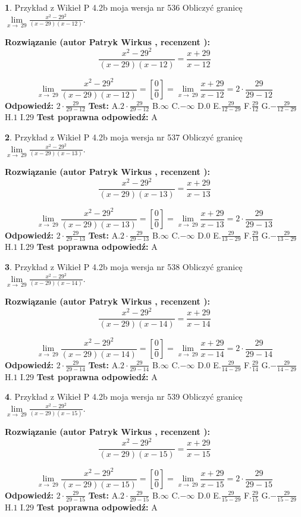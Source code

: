 \documentclass[12pt, a4paper]{article}
\theoremstyle{definition} %
\newtheorem{zad}{}
\newcommand{\zadStart}[1]{\begin{zad}#1\newline}
\newcommand{\zadStop}{\end{zad}}
\newcommand{\rozwStart}[2]{\noindent \textbf{Rozwiązanie (autor #1 , recenzent #2): }\newline}
\newcommand{\rozwStop}{\newline}
\newcommand{\odpStart}{\noindent \textbf{Odpowiedź:}\newline}
\newcommand{\odpStop}{\newline}
\newcommand{\testStart}{\noindent \textbf{Test:}\newline}
\newcommand{\testStop}{\newline}
\newcommand{\kluczStart}{\noindent \textbf{Test poprawna odpowiedź:}\newline}
\newcommand{\kluczStop}{\newline}
\begin{document}
\zadStart{Przykład z Wikieł P 4.2b moja wersja nr 536}
Obliczyć granicę $\lim\limits_{x\to\ 29}\frac{x^{2}-29^{2}}{(x-29)(x-12)}$.
\zadStop
\rozwStart{Patryk Wirkus}{}
$$\frac{x^{2}-29^{2}}{(x-29)(x-12)}=\frac{x+29}{x-12}$$

$$\lim\limits_{x\to\ 29}\frac{x^{2}-29^{2}}{(x-29)(x-12)}=[\frac{0}{0}]=\lim\limits_{x\to\ 29}\frac{x+29}{x-12}=2 \cdot \frac{29}{29-12}$$
\rozwStop
\odpStart
$2 \cdot \frac{29}{29-12}$
\odpStop
\testStart
A.$2 \cdot \frac{29}{29-12}$
B.$\infty$
C.$-\infty$
D.$0$
E.$\frac{29}{12-29}$
F.$\frac{29}{12}$
G.$-\frac{29}{12-29}$
H.$1$
I.$29$
\testStop
\kluczStart
A
\kluczStop



\zadStart{Przykład z Wikieł P 4.2b moja wersja nr 537}
Obliczyć granicę $\lim\limits_{x\to\ 29}\frac{x^{2}-29^{2}}{(x-29)(x-13)}$.
\zadStop
\rozwStart{Patryk Wirkus}{}
$$\frac{x^{2}-29^{2}}{(x-29)(x-13)}=\frac{x+29}{x-13}$$

$$\lim\limits_{x\to\ 29}\frac{x^{2}-29^{2}}{(x-29)(x-13)}=[\frac{0}{0}]=\lim\limits_{x\to\ 29}\frac{x+29}{x-13}=2 \cdot \frac{29}{29-13}$$
\rozwStop
\odpStart
$2 \cdot \frac{29}{29-13}$
\odpStop
\testStart
A.$2 \cdot \frac{29}{29-13}$
B.$\infty$
C.$-\infty$
D.$0$
E.$\frac{29}{13-29}$
F.$\frac{29}{13}$
G.$-\frac{29}{13-29}$
H.$1$
I.$29$
\testStop
\kluczStart
A
\kluczStop



\zadStart{Przykład z Wikieł P 4.2b moja wersja nr 538}
Obliczyć granicę $\lim\limits_{x\to\ 29}\frac{x^{2}-29^{2}}{(x-29)(x-14)}$.
\zadStop
\rozwStart{Patryk Wirkus}{}
$$\frac{x^{2}-29^{2}}{(x-29)(x-14)}=\frac{x+29}{x-14}$$

$$\lim\limits_{x\to\ 29}\frac{x^{2}-29^{2}}{(x-29)(x-14)}=[\frac{0}{0}]=\lim\limits_{x\to\ 29}\frac{x+29}{x-14}=2 \cdot \frac{29}{29-14}$$
\rozwStop
\odpStart
$2 \cdot \frac{29}{29-14}$
\odpStop
\testStart
A.$2 \cdot \frac{29}{29-14}$
B.$\infty$
C.$-\infty$
D.$0$
E.$\frac{29}{14-29}$
F.$\frac{29}{14}$
G.$-\frac{29}{14-29}$
H.$1$
I.$29$
\testStop
\kluczStart
A
\kluczStop



\zadStart{Przykład z Wikieł P 4.2b moja wersja nr 539}
Obliczyć granicę $\lim\limits_{x\to\ 29}\frac{x^{2}-29^{2}}{(x-29)(x-15)}$.
\zadStop
\rozwStart{Patryk Wirkus}{}
$$\frac{x^{2}-29^{2}}{(x-29)(x-15)}=\frac{x+29}{x-15}$$

$$\lim\limits_{x\to\ 29}\frac{x^{2}-29^{2}}{(x-29)(x-15)}=[\frac{0}{0}]=\lim\limits_{x\to\ 29}\frac{x+29}{x-15}=2 \cdot \frac{29}{29-15}$$
\rozwStop
\odpStart
$2 \cdot \frac{29}{29-15}$
\odpStop
\testStart
A.$2 \cdot \frac{29}{29-15}$
B.$\infty$
C.$-\infty$
D.$0$
E.$\frac{29}{15-29}$
F.$\frac{29}{15}$
G.$-\frac{29}{15-29}$
H.$1$
I.$29$
\testStop
\kluczStart
A
\kluczStop
\end{document}
